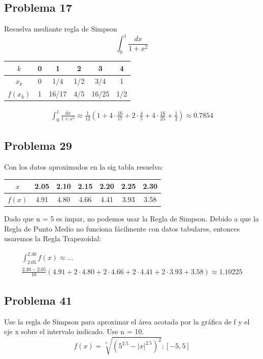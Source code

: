 \documentclass{article}
\begin{document}
\subsection{Problema 17}
Resuelva mediante regla de Simpson
$$
  \int_{0}^{1}\frac{dx}{1+x^2}
$$

\begin{center}
  \begin{tabular}{|c|c|c|c|c|c|}
    \hline
    $ k $      & 0 & 1     & 2   & 3     & 4   \\
    \hline
    $ x_k $    & 0 & 1/4   & 1/2 & 3/4   & 1   \\
    \hline
    $ f(x_k) $ & 1 & 16/17 & 4/5 & 16/25 & 1/2 \\
    \hline
  \end{tabular}
\end{center}

\begin{align*}
  \int_{0}^{1} \frac{dx}{1+x^2} \approx \frac{1}{12}\left(1+4\cdot\frac{16}{17}+2\cdot\frac{4}{5}+4\cdot\frac{16}{25}+\frac{1}{2}\right) \approx 0.7854
\end{align*}

\subsection{Problema 29}
Con los datos aproximados en la sig tabla resuelva:
\begin{center}
  \begin{tabular}{|c|c|c|c|c|c|c|}
    \hline
    $ x $    & 2.05 & 2.10 & 2.15 & 2.20 & 2.25 & 2.30 \\
    \hline
    $ f(x) $ & 4.91 & 4.80 & 4.66 & 4.41 & 3.93 & 3.58 \\
    \hline
  \end{tabular}
\end{center}
Dado que n = 5 es impar, no podemos usar la Regla de Simpson. Debido a que la Regla de Punto Medio no funciona fácilmente con datos tabulares, entonces usaremos la Regla Trapezoidal:

\begin{align*}
  \int_{2.05}^{2.30} f(x) \approx \dots \\ \frac{2.30-2.05}{10} (4.91 + 2 \cdot 4.80 + 2 \cdot 4.66 + 2 \cdot 4.41 + 2 \cdot 3.93 + 3.58) \approx 1.10225
\end{align*}
\subsection{Problema 41}
Use la regla de Simpson para aproximar el área acotada por la gráfica de f y el eje x sobre el intervalo indicado. Use n = 10.
$$
  f(x) = \sqrt[5]{(5^{2.5}-|x|^{2.5})^2}  ;  [-5,5]
$$
\end{document}
